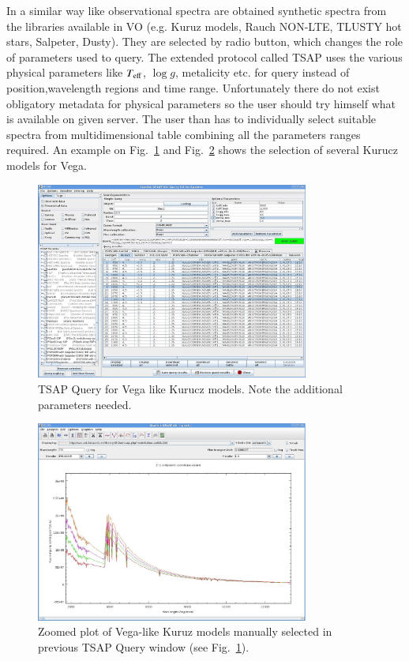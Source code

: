 \documentclass[final,authoryear,5p,times,twocolumn]{elsarticle}
\begin{document}
In a similar way like observational spectra  are obtained synthetic spectra
from the libraries  available in VO (e.g. Kuruz models, Rauch NON-LTE, TLUSTY
hot stars, Salpeter, Dusty). They are selected by radio button, which  changes
the role of parameters used to query. The extended protocol called TSAP
\citep{ssap} uses  the various physical parameters like $T_{\rm eff}$, $\log g$,
metalicity etc. for query instead of position,wavelength regions and time
range. Unfortunately there do not exist obligatory metadata for physical
parameters so the user should try himself what is available on given server.
The user than has to individually select suitable spectra from multidimensional
table combining all the parameters ranges required.  An example on
Fig.~\ref{fig:TSAP-query} and Fig.~\ref{fig:TSAP-plot} shows the selection of
several Kurucz models for Vega.


\begin{figure}[t]
\begin{center}
\includegraphics[width=0.8\textwidth]{TSSA-query.pdf}
\caption{TSAP Query for Vega like Kurucz models. Note the additional parameters needed.}
\label{fig:TSAP-query}
\end{center}
\end{figure}


\begin{figure}[t]
\begin{center}
\includegraphics[width=0.8\textwidth]{TSSA-plot.pdf}
\caption{Zoomed plot of Vega-like Kuruz models manually selected in previous
TSAP Query window (see Fig.~\ref{fig:TSAP-query}). }
\label{fig:TSAP-plot}
\end{center}
\end{figure}
\end{document}

